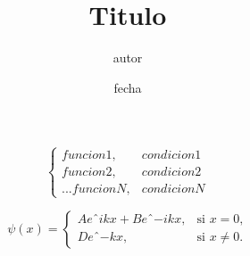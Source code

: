 \documentclass[a4paper]{article}
\title{Titulo}
\author{autor}
\date{fecha}
\begin{document}
 

	$$
		\begin{cases} %
			funcion1 , & condicion1 \\
			funcion2 , & condicion2 \\
			.
			.
			.
			funcionN , & condicionN 
		\end{cases} %
	$$


	$$
	\psi(x)=\begin{cases}
	Aeˆ{ikx}+Beˆ{-ikx},
	& \mbox{si $x=0$,}\\
	Deˆ{- kx}, & \mbox{si $x\neq0$.}
	\end{cases}
	$$
\end{document}
